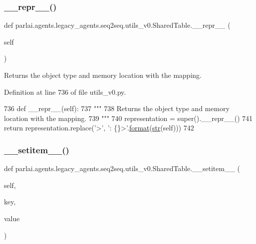 \subsubsection{\texorpdfstring{\+\_\+\+\_\+repr\+\_\+\+\_\+()}{\_\_repr\_\_()}}
{\footnotesize\ttfamily def parlai.\+agents.\+legacy\+\_\+agents.\+seq2seq.\+utils\+\_\+v0.\+Shared\+Table.\+\_\+\+\_\+repr\+\_\+\+\_\+ (\begin{DoxyParamCaption}\item[{}]{self }\end{DoxyParamCaption})}

\begin{DoxyVerb}Returns the object type and memory location with the mapping.
\end{DoxyVerb}
 

Definition at line 736 of file utils\+\_\+v0.\+py.


\begin{DoxyCode}
736     \textcolor{keyword}{def }\_\_repr\_\_(self):
737         \textcolor{stringliteral}{"""}
738 \textcolor{stringliteral}{        Returns the object type and memory location with the mapping.}
739 \textcolor{stringliteral}{        """}
740         representation = super().\_\_repr\_\_()
741         \textcolor{keywordflow}{return} representation.replace(\textcolor{stringliteral}{'>'}, \textcolor{stringliteral}{': \{\}>'}.\hyperlink{namespaceparlai_1_1chat__service_1_1services_1_1messenger_1_1shared__utils_a32e2e2022b824fbaf80c747160b52a76}{format}(\hyperlink{namespacegenerate__task__READMEs_a5b88452ffb87b78c8c85ececebafc09f}{str}(self)))
742 
\end{DoxyCode}
\mbox{\label{classparlai_1_1agents_1_1legacy__agents_1_1seq2seq_1_1utils__v0_1_1SharedTable_a03c479f82d23393bb64f53fd2ba70b6d}} 
\subsubsection{\texorpdfstring{\+\_\+\+\_\+setitem\+\_\+\+\_\+()}{\_\_setitem\_\_()}}
{\footnotesize\ttfamily def parlai.\+agents.\+legacy\+\_\+agents.\+seq2seq.\+utils\+\_\+v0.\+Shared\+Table.\+\_\+\+\_\+setitem\+\_\+\+\_\+ (\begin{DoxyParamCaption}\item[{}]{self,  }\item[{}]{key,  }\item[{}]{value }\end{DoxyParamCaption})}

